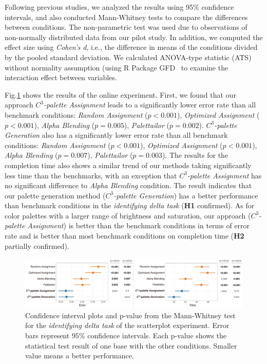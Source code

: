 {%
{}
Following previous studies, we analyzed the results using 95\% confidence intervals, and also conducted Mann-Whitney tests to compare the differences between conditions. The non-parametric test was used due to observations of non-normally distributed data from our pilot study. In addition, we computed the effect size using \emph{Cohen's d}, i.e., the difference in means of the conditions divided by the pooled standard deviation. We calculated ANOVA-type statistic (ATS) without normality assumption (using R Package GFD~\cite{gfd2017} to examine the interaction effect between variables.


Fig.\ref{fig:difference-results} shows the results of the online experiment.
First, we found that our approach \emph{$C^3$-palette Assignment} leads to a significantly lower error rate than all benchmark conditions: \emph{Random Assignment} ($p<0.001$), \emph{Optimized Assignment} ($p<0.001$), \emph{Alpha Blending} ($p=0.005$), \emph{Palettailor} ($p=0.002$). \emph{$C^3$-palette Generation} also has a significantly lower error rate than all benchmark conditions: \emph{Random Assignment} ($p<0.001$), \emph{Optimized Assignment} ($p<0.001$), \emph{Alpha Blending} ($p=0.007$), \emph{Palettailor} ($p=0.003$).
The results for the completion time also shows a similar trend of our methods taking significantly less time than the benchmarks, with an exception that \emph{$C^3$-palette Assignment} has no significant difference to \emph{Alpha Blending} condition.
The result indicates that our palette generation method (\emph{$C^3$-palette Generation}) has a better performance than benchmark conditions in the \emph{identifying delta task} (\textbf{H1} confirmed). As for color palettes with a larger range of brightness and saturation, our approach (\emph{$C^3$-palette Assignment}) is better than the benchmark conditions in terms of error rate and is better than most benchmark conditions on completion time (\textbf{H2} partially confirmed).

\begin{figure}[!tb]
\centering
\includegraphics[width=1\linewidth]{figures/difference-results.pdf}
\caption{Confidence interval plots and p-value from the Mann-Whitney test for the \emph{identifying delta task} of the scatterplot experiment. Error bars represent $95\%$ confidence intervals. Each p-value shows the statistical test result of one base with the other conditions. Smaller value means a better performance.}
\vspace*{-3mm}
\label{fig:difference-results}
\end{figure}


}
